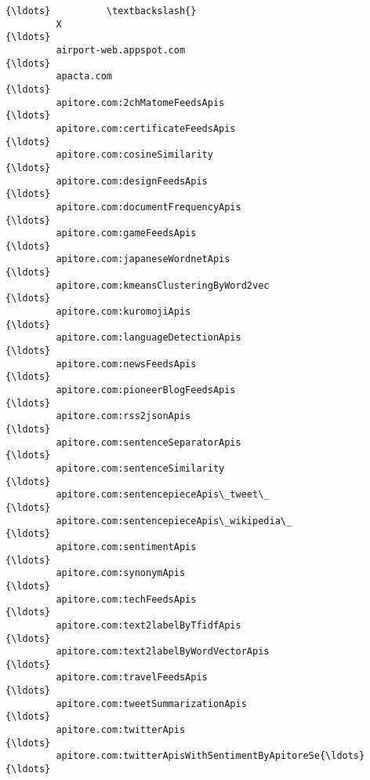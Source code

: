 \documentclass[11pt]{article}
\begin{document}
\begin{Verbatim}[commandchars=\\\{\}]
                                                                    {\ldots}          \textbackslash{}
         X                                                          {\ldots}           
         airport-web.appspot.com                                    {\ldots}           
         apacta.com                                                 {\ldots}           
         apitore.com:2chMatomeFeedsApis                             {\ldots}           
         apitore.com:certificateFeedsApis                           {\ldots}           
         apitore.com:cosineSimilarity                               {\ldots}           
         apitore.com:designFeedsApis                                {\ldots}           
         apitore.com:documentFrequencyApis                          {\ldots}           
         apitore.com:gameFeedsApis                                  {\ldots}           
         apitore.com:japaneseWordnetApis                            {\ldots}           
         apitore.com:kmeansClusteringByWord2vec                     {\ldots}           
         apitore.com:kuromojiApis                                   {\ldots}           
         apitore.com:languageDetectionApis                          {\ldots}           
         apitore.com:newsFeedsApis                                  {\ldots}           
         apitore.com:pioneerBlogFeedsApis                           {\ldots}           
         apitore.com:rss2jsonApis                                   {\ldots}           
         apitore.com:sentenceSeparatorApis                          {\ldots}           
         apitore.com:sentenceSimilarity                             {\ldots}           
         apitore.com:sentencepieceApis\_tweet\_                       {\ldots}           
         apitore.com:sentencepieceApis\_wikipedia\_                   {\ldots}           
         apitore.com:sentimentApis                                  {\ldots}           
         apitore.com:synonymApis                                    {\ldots}           
         apitore.com:techFeedsApis                                  {\ldots}           
         apitore.com:text2labelByTfidfApis                          {\ldots}           
         apitore.com:text2labelByWordVectorApis                     {\ldots}           
         apitore.com:travelFeedsApis                                {\ldots}           
         apitore.com:tweetSummarizationApis                         {\ldots}           
         apitore.com:twitterApis                                    {\ldots}           
         apitore.com:twitterApisWithSentimentByApitoreSe{\ldots}         {\ldots}           

\end{Verbatim}
\end{document}
